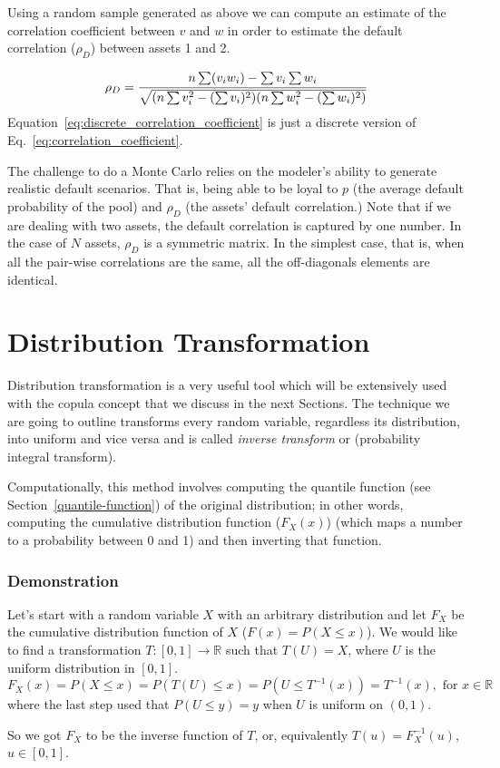 Using a random sample generated as above we can compute an estimate of
the correlation coefficient between $v$ and $w$ in order to estimate
the default correlation ($\rho_D$) between assets 1 and 2.

\begin{equation}
\rho_D = \cfrac{n\sum (v_i w_i) - \sum v_i \sum w_i}{\sqrt{(n\sum v_i^2 - (\sum v_i)^2)(n\sum w_i^2 - (\sum w_i)^2)}}
\label{eq:discrete_correlation_coefficient}
\end{equation}
Equation~\ref{eq:discrete_correlation_coefficient} is just a discrete
version of Eq.~\ref{eq:correlation_coefficient}.

The challenge to do a Monte Carlo relies on the modeler’s ability to generate
realistic default scenarios. That is, being able to be loyal to $p$ (the average
default probability of the pool) and $\rho_D$ (the assets’ default correlation.) Note that if we are dealing with two assets, the default correlation is captured by one number. In the case of $N$ assets, $\rho_D$ is a symmetric matrix. In the
simplest case, that is, when all the pair-wise correlations are the same, all the
off-diagonals elements are identical. 

\section{Distribution Transformation}\label{distribution-transformation}

Distribution transformation is a very useful tool which will be
extensively used with the copula concept that we discuss in the next
Sections. The technique we are going to outline transforms every random
variable, regardless its distribution, into uniform and vice versa and is called
\emph{inverse transform} or (probability integral transform).

Computationally, this method involves computing the quantile function 
(see Section~\ref{quantile-function}) of
the original distribution; in other words, computing the cumulative
distribution function ($F_X(x)$) (which maps a number
to a probability between 0 and 1) and then inverting that
function. 

\begin{attention}
\subsubsection{Demonstration}
Let's start with a random variable $X$ with an arbitrary distribution and let $F_X$ be the 
cumulative distribution function of $X$ (\(F(x) = P(X \leq x)\)).
We would like to find a transformation $T:[0,1]\rightarrow\mathbb{R}$ such that $T(U)=X$, where
$U$ is the uniform distribution in $[0,1]$. 
\begin{equation*}
F_{X}(x)= P(X\leq x)=P(T(U)\leq x)= P(U\leq T^{-1}(x))=T^{-1}(x),{\text{ for }}x\in \mathbb {R}
\end{equation*}
where the last step used that $P(U\leq y)=y$ when $U$ is uniform on $(0,1)$.

So we got $F_{X}$ to be the inverse function of $T$, or, equivalently $T(u)=F_{X}^{-1}(u)$, $u\in [0,1]$.
\end{attention}

